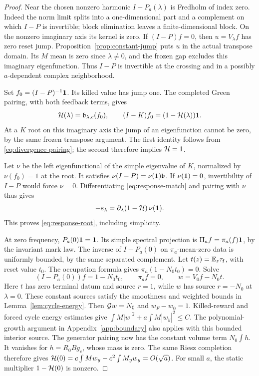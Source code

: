\begin{proof}
Near the chosen nonzero harmonic $I-P_a(\lambda)$ is Fredholm of index
zero. Indeed the norm limit splits into a one-dimensional part and a
complement on which $I-P$ is invertible; block elimination leaves a
finite-dimensional block. On the nonzero imaginary axis its kernel
is zero. If $(I-P)f=0$, then $u=V_\lambda f$ has zero reset jump.
Proposition~\ref{prop:constant-jump} puts $u$ in the actual transpose
domain. Its $M$ mean is zero since $\lambda\ne0$, and the frozen gap
excludes this imaginary eigenfunction. Thus $I-P$ is invertible at
the crossing and in a possibly $a$-dependent complex neighborhood.

Set $f_0=(I-P)^{-1}\mathbf 1$. Its killed value has jump one. The completed
Green pairing, with both feedback terms, gives
\begin{equation}\label{eq:response-match}
 \mathcal H(\lambda)=\mathfrak b_{\lambda,c}(f_0),\qquad
 (I-K)f_0=(1-\mathcal H(\lambda))\mathbf 1.
\end{equation}
At a $K$ root on this imaginary axis the jump of an eigenfunction
cannot be zero, by the same frozen transpose argument. The first
identity follows from \eqref{eq:divergence-pairing}; the second
therefore implies $\mathcal H=1$.

Let $\nu$ be the left eigenfunctional of the simple eigenvalue of $K$,
normalized by $\nu(f_0)=1$ at the root. It satisfies
$\nu(I-P)=\nu(\mathbf 1)\mathfrak b$. If $\nu(\mathbf 1)=0$, invertibility of $I-P$
would force $\nu=0$. Differentiating \eqref{eq:response-match} and
pairing with $\nu$ thus gives
\[
 -e_\lambda=\partial_\lambda(1-\mathcal H)\,\nu(\mathbf 1).
\]
This proves \eqref{eq:response-root}, including simplicity.

At zero frequency, $P_a(0)\mathbf 1=\mathbf 1$. Its simple spectral projection
is $\Pi_a f=\pi_a(f)\mathbf 1$, by the invariant mark law. The inverse of
$I-P_a(0)$ on $\pi_a$-mean-zero data is uniformly bounded, by the
same separated complement. Let $t(z)=\mathbb E_z{\tau_{\mathrm f}}$, with reset value $t_0$.
The occupation formula gives $\pi_a(1-N_0t_0)=0$. Solve
\[
 (I-P_a(0))f=1-N_0t_0,\qquad \pi_a f=0,
 \qquad w=V_0f-N_0t.
\]
Here $t$ has zero terminal datum and source $r=1$, while $w$ has
source $r=-N_0$ at $\lambda=0$. These constant sources satisfy the
smoothness and weighted bounds in Lemma~\ref{lem:cycle-energy}.
Then $\mathcal G w=N_0$ and $w_F-w_0=1$. Killed-reward and forced cycle
energy estimates give $\int M|w|^2+a\int M|w_y|^2\le C$.
The polynomial-growth argument in Appendix~\ref{app:boundary}
also applies with this bounded interior source. The generator
pairing now has the constant volume term $N_0\int h$. It vanishes
for $h=R_0Bg_c$, whose mass is zero. The same Riesz completion
therefore gives
$\mathcal H(0)=c\int Mw_y-c^2\int M_yw_y=O(\sqrt a)$.
For small $a$, the static multiplier $1-\mathcal H(0)$ is nonzero.
\end{proof}

